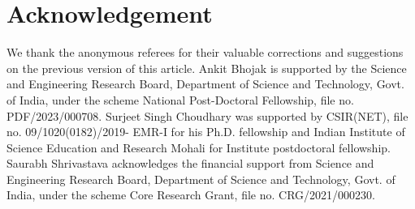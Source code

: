\documentclass[a4paper,reqno]{amsart}
\theoremstyle{definition}
\theoremstyle{remark}
\numberwithin{equation}{section}
\begin{document}
	\section*{Acknowledgement}
	We thank the anonymous referees for their valuable corrections and suggestions on the previous version of this article. Ankit Bhojak is supported by the Science and Engineering Research Board, Department of Science and Technology, Govt. of India, under the scheme National Post-Doctoral Fellowship, file no. PDF/2023/000708. Surjeet Singh Choudhary was supported by CSIR(NET), file no. 09/1020(0182)/2019- EMR-I for his Ph.D. fellowship and Indian Institute of Science Education and Research Mohali for Institute postdoctoral fellowship. Saurabh Shrivastava acknowledges the financial support from Science and Engineering Research Board, Department of Science and Technology, Govt. of India, under the scheme Core Research Grant, file no. CRG/2021/000230.
	
\end{document}
